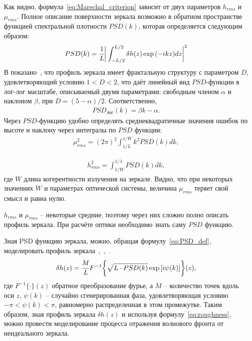 Как видно, формула~\ref{eq:Marechal_criterion} зависит от двух параметров $h_{rms}$ и $\mu_{rms}$. Полное описание поверхности зеркала возможно в обратном пространстве функцией спектральной плотности $PSD(k)$, которая определяется следующим образом: 
\begin{align}
	PSD(k) =  \cfrac{1}{L} \bigg| \int_{-L/2}^{L/2} \delta h(z) \exp{(-ikz)dz}  \bigg|^2
	\label{eq:PSD_def}
\end{align}
В показано~\cite{angeisky_fractal_nodate}, что профиль зеркала имеет фрактальную структуру с параметром $D$, удовлетворяющий условию $1 < D < 2$, что даёт линейный вид $PSD$-функции в лог-лог масштабе, описываемый двумя параметрами: свободным членом $\alpha$ и наклоном $\beta$, при $D = (5 - \alpha)/2$. Соответственно, 
\begin{align}
	PSD_{лог}(k) =  \beta k - \alpha.
\end{align}
Через $PSD$-функцию удобно определять среднеквадратичные значения ошибок по высоте и наклону через интегралы по $PSD$ функции:
\begin{align}
	\mu^2_{rms} =  (2 \pi)^2 \int^{1/W}_{1/L} k^2 PSD(k) dk,
\end{align}

\begin{align}
	h^2_{rms} =  \int^{1/\lambda}_{1/W} PSD(k) dk,
\end{align}
где $W$ длина когерентности излучения на зеркале. Видно, что при некоторых значениях $W$ и параметрах оптической системы, величина $\mu_{rms}$ теряет свой смысл и равна нулю. 

$h_{rms}$ и $\mu_{rms}$ -- некоторые средние, поэтому через них сложно полно описать профиль зеркала. При расчёте оптики необходимо знать саму $PSD$ функцию. 

Зная PSD функцию зеркала, можно, обращая формулу~\ref{eq:PSD_def}, моделировать профиль зеркала~\cite{hua_using_2013},~\cite{xu_statistical_2012},~\cite{barty_predicting_2009}.
\begin{align}
	\delta h(z) = \cfrac{M}{L} F^{-1} \bigg\{\sqrt{L \cdot PSD(k)} \exp{[i \psi(k)]} \bigg\}(z),
\end{align}
где $F^{-1}\{\cdot\}(z)$ обратное преобразование фурье, а $M$ -- количество точек вдоль оси $z$, $\psi(k)$ -- случайно сгенерированная фаза, удовлетворяющая условию $-\pi < \psi(k) <\pi$, равномерно распределенная в этом промежутке. Таким образом, зная профиль зеркала $\delta h(z)$ и используя формулу~\ref{eq:roughness}, можно провести моделирование процесса отражения волнового фронта от неидеального зеркала.
\normalsize%
